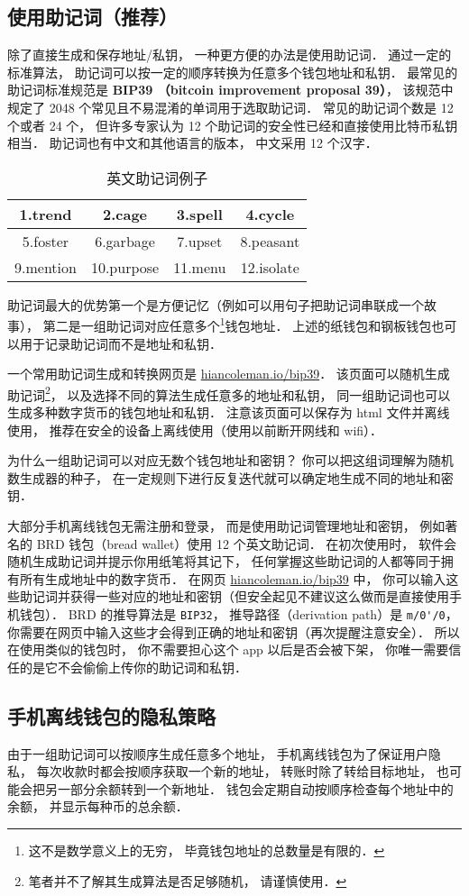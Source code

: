 \subsection{使用助记词（推荐）}
除了直接生成和保存地址/私钥， 一种更方便的办法是使用助记词． 通过一定的标准算法， 助记词可以按一定的顺序转换为任意多个钱包地址和私钥． 最常见的助记词标准规范是 \textbf{BIP39 （bitcoin improvement proposal 39）}， 该规范中规定了 2048 个常见且不易混淆的单词用于选取助记词． 常见的助记词个数是 12 个或者 24 个， 但许多专家认为 12 个助记词的安全性已经和直接使用比特币私钥相当． 助记词也有中文和其他语言的版本， 中文采用 12 个汉字．
\begin{table}[ht]
\centering
\caption{英文助记词例子}\label{CryWal_tab1}
\begin{tabular}{|c|c|c|c|}
\hline
1.trend & 2.cage & 3.spell & 4.cycle \\
\hline
5.foster & 6.garbage & 7.upset & 8.peasant \\
\hline
9.mention & 10.purpose & 11.menu & 12.isolate \\
\hline
\end{tabular}
\end{table}

助记词最大的优势第一个是方便记忆（例如可以用句子把助记词串联成一个故事）， 第二是一组助记词对应任意多个\footnote{这不是数学意义上的无穷， 毕竟钱包地址的总数量是有限的．}钱包地址． 上述的纸钱包和钢板钱包也可以用于记录助记词而不是地址和私钥．

一个常用助记词生成和转换网页是 \href{https://iancoleman.io/bip39/}{hiancoleman.io/bip39}． 该页面可以随机生成助记词\footnote{笔者并不了解其生成算法是否足够随机， 请谨慎使用．}， 以及选择不同的算法生成任意多的地址和私钥， 同一组助记词也可以生成多种数字货币的钱包地址和私钥． 注意该页面可以保存为 html 文件并离线使用， 推荐在安全的设备上离线使用（使用以前断开网线和 wifi）．

为什么一组助记词可以对应无数个钱包地址和密钥？ 你可以把这组词理解为随机数生成器的种子， 在一定规则下进行反复迭代就可以确定地生成不同的地址和密钥．

大部分手机离线钱包无需注册和登录， 而是使用助记词管理地址和密钥， 例如著名的 BRD 钱包（bread wallet）使用 12 个英文助记词． 在初次使用时， 软件会随机生成助记词并提示你用纸笔将其记下， 任何掌握这些助记词的人都等同于拥有所有生成地址中的数字货币． 在网页 \href{https://iancoleman.io/bip39/}{hiancoleman.io/bip39} 中， 你可以输入这些助记词并获得一些对应的地址和密钥（但安全起见不建议这么做而是直接使用手机钱包）． BRD 的推导算法是 \verb|BIP32|， 推导路径（derivation path）是 \verb|m/0'/0|， 你需要在网页中输入这些才会得到正确的地址和密钥（再次提醒注意安全）． 所以在使用类似的钱包时， 你不需要担心这个 app 以后是否会被下架， 你唯一需要信任的是它不会偷偷上传你的助记词和私钥．

\subsection{手机离线钱包的隐私策略}
由于一组助记词可以按顺序生成任意多个地址， 手机离线钱包为了保证用户隐私， 每次收款时都会按顺序获取一个新的地址， 转账时除了转给目标地址， 也可能会把另一部分余额转到一个新地址． 钱包会定期自动按顺序检查每个地址中的余额， 并显示每种币的总余额．
